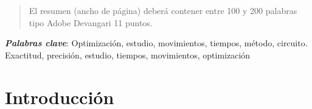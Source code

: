     
    
    
    \maketitle
    \thispagestyle{fancy}
    
    
    
    \begin{abstract}
    \noindent 
    El resumen (ancho de página) deberá contener entre 100 y 200 palabras tipo Adobe Devangari 11 puntos.
     \end{abstract}
    \textbf{\textit{Palabras clave}}: 
    Optimización, estudio, movimientos, tiempos, método, circuito.
    Exactitud, precisión, estudio, tiempos, movimientos, optimización



    
    \section{Introducción}

